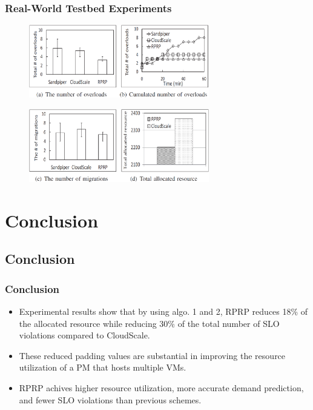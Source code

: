\documentclass{beamer}
\begin{document}
	\begin{frame}
	\frametitle{Real-World Testbed Experiments}
		\begin{figure}[h!]
		\centering
		\includegraphics[width=0.7\textwidth]{./figure/eva3_1.PNG}
		\end{figure}
		\begin{figure}[h!]
		\centering
		\includegraphics[width=0.7\textwidth]{./figure/eva3_2.PNG}
		\end{figure}
	\end{frame}

\section{Conclusion}

\subsection{Conclusion}
	\begin{frame}
	\frametitle{Conclusion}
		\begin{itemize}
		\item Experimental results show that by using algo. 1 and 2, RPRP reduces 18\% of the allocated resource while reducing 30\% of the total number of SLO violations compared to CloudScale.
		\item These reduced padding values are substantial in improving the resource utilization of a PM that hosts multiple VMs.
		\item RPRP achives higher resource utilization, more accurate demand prediction, and fewer SLO violations than previous schemes.
		\end{itemize}
	\end{frame}
\end{document}
